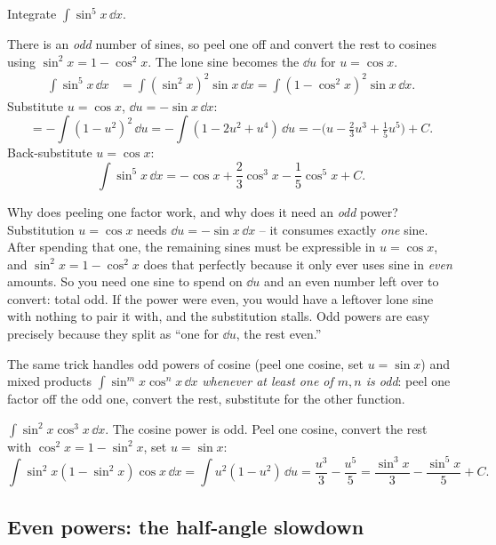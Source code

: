\begin{example}
\label{ch24:ex-odd}
Integrate $\displaystyle \int \sin^5 x\,\dd x.$
\end{example}

There is an \emph{odd} number of sines, so peel one off
and convert the rest to cosines using $\sin^2 x = 1 - \cos^2 x$. The lone sine
becomes the $\dd u$ for $u = \cos x$.
\begin{align*}
\int \sin^5 x\,\dd x
&= \int (\sin^2 x)^2 \sin x\,\dd x
= \int (1 - \cos^2 x)^2 \sin x\,\dd x.
\end{align*}
Substitute $u = \cos x$, $\dd u = -\sin x\,\dd x$:
\[
= -\int (1 - u^2)^2\,\dd u
= -\int (1 - 2u^2 + u^4)\,\dd u
= -\Big(u - \tfrac{2}{3}u^3 + \tfrac{1}{5}u^5\Big) + C.
\]
Back-substitute $u = \cos x$:
\[
\int \sin^5 x\,\dd x = -\cos x + \frac{2}{3}\cos^3 x - \frac{1}{5}\cos^5 x + C.
\]

\begin{whybox}
Why does peeling one factor work, and why does it need an \emph{odd} power?
Substitution $u=\cos x$ needs $\dd u = -\sin x\,\dd x$ -- it consumes exactly
\emph{one} sine. After spending that one, the remaining sines must be
expressible in $u=\cos x$, and $\sin^2 x = 1 - \cos^2 x$ does that perfectly
because it only ever uses sine in \emph{even} amounts. So you need one sine to
spend on $\dd u$ and an even number left over to convert: total odd. If the
power were even, you would have a leftover lone sine with nothing to pair it
with, and the substitution stalls. Odd powers are easy precisely because they
split as ``one for $\dd u$, the rest even.''
\end{whybox}

The same trick handles odd powers of cosine (peel one cosine, set $u=\sin x$)
and mixed products $\int \sin^m x\cos^n x\,\dd x$ \emph{whenever at least one
of $m,n$ is odd}: peel one factor off the odd one, convert the rest, substitute
for the other function.

\begin{example}
$\displaystyle \int \sin^2 x\cos^3 x\,\dd x.$ The cosine power is odd. Peel one
cosine, convert the rest with $\cos^2 x = 1 - \sin^2 x$, set $u = \sin x$:
\[
\int \sin^2 x(1-\sin^2 x)\cos x\,\dd x
= \int u^2(1-u^2)\,\dd u
= \frac{u^3}{3} - \frac{u^5}{5}
= \frac{\sin^3 x}{3} - \frac{\sin^5 x}{5} + C.
\]
\end{example}

\subsection{Even powers: the half-angle slowdown}

